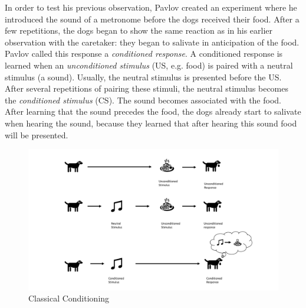 In order to test his previous observation, Pavlov created an experiment where he introduced the sound of a metronome before the dogs received their food. After a few repetitions, the dogs began to show the same reaction as in his earlier observation with the caretaker: they began to salivate in anticipation of the food.
Pavlov called this response a \emph{conditioned response}. A conditioned response is learned when an \emph{unconditioned stimulus} (US, e.g. food) is paired with a neutral stimulus (a sound). Usually, the neutral stimulus is presented before the US. After several repetitions of pairing these stimuli, the neutral stimulus becomes the \emph{conditioned stimulus} (CS). The sound becomes associated with the food. After learning that the sound precedes the food, the dogs already start to salivate when hearing the sound, because they learned that after hearing this sound food will be presented.
\begin{figure}
    \centering
    \includegraphics[width=1\textwidth]{Plots/ClassicalConditioning.pdf}
    \caption{Classical Conditioning}
    \label{fig:Classical_Conditioning}
\end{figure}


